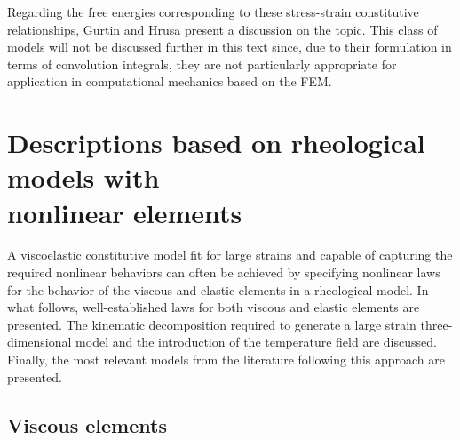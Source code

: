 Regarding the free energies corresponding to these stress-strain constitutive relationships, Gurtin and Hrusa \citep{gurtinEnergiesNonlinearViscoelastic1988} present a discussion on the topic.
This class of models will not be discussed further in this text since, due to their formulation in terms of convolution integrals, they are not particularly appropriate for application in computational mechanics based on the FEM.

\section{Descriptions based on rheological models with\\ nonlinear elements}

A viscoelastic constitutive model fit for large strains and capable of capturing the required nonlinear behaviors can often be achieved by specifying nonlinear laws for the behavior of the viscous and elastic elements in a rheological model.
In what follows, well-established laws for both viscous and elastic elements are presented.
The kinematic decomposition required to generate a large strain three-dimensional model and the introduction of the temperature field are discussed.
Finally, the most relevant models from the literature following this approach are presented.


\subsection{Viscous elements}
\label{sec:viscous_elements}

